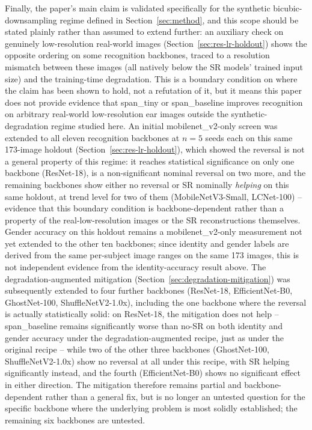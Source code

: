 \documentclass[11pt]{article}
\begin{document}
Finally, the paper's main claim is validated specifically for the synthetic bicubic-downsampling regime defined in Section~\ref{sec:method}, and this scope should be stated plainly rather than assumed to extend further: an auxiliary check on genuinely low-resolution real-world images (Section~\ref{sec:res-lr-holdout}) shows the opposite ordering on some recognition backbones, traced to a resolution mismatch between these images (all natively below the SR models' trained input size) and the training-time degradation. This is a boundary condition on where the claim has been shown to hold, not a refutation of it, but it means this paper does not provide evidence that span\_tiny or span\_baseline improves recognition on arbitrary real-world low-resolution ear images outside the synthetic-degradation regime studied here. An initial mobilenet\_v2-only screen was extended to all eleven recognition backbones at $n=5$ seeds each on this same 173-image holdout (Section~\ref{sec:res-lr-holdout}), which showed the reversal is not a general property of this regime: it reaches statistical significance on only one backbone (ResNet-18), is a non-significant nominal reversal on two more, and the remaining backbones show either no reversal or SR nominally \emph{helping} on this same holdout, at trend level for two of them (MobileNetV3-Small, LCNet-100) -- evidence that this boundary condition is backbone-dependent rather than a property of the real-low-resolution images or the SR reconstructions themselves. Gender accuracy on this holdout remains a mobilenet\_v2-only measurement not yet extended to the other ten backbones; since identity and gender labels are derived from the same per-subject image ranges on the same 173 images, this is not independent evidence from the identity-accuracy result above. The degradation-augmented mitigation (Section~\ref{sec:degradation-mitigation}) was subsequently extended to four further backbones (ResNet-18, EfficientNet-B0, GhostNet-100, ShuffleNetV2-1.0x), including the one backbone where the reversal is actually statistically solid: on ResNet-18, the mitigation does not help -- span\_baseline remains significantly worse than no-SR on both identity and gender accuracy under the degradation-augmented recipe, just as under the original recipe -- while two of the other three backbones (GhostNet-100, ShuffleNetV2-1.0x) show no reversal at all under this recipe, with SR helping significantly instead, and the fourth (EfficientNet-B0) shows no significant effect in either direction. The mitigation therefore remains partial and backbone-dependent rather than a general fix, but is no longer an untested question for the specific backbone where the underlying problem is most solidly established; the remaining six backbones are untested.
\end{document}
